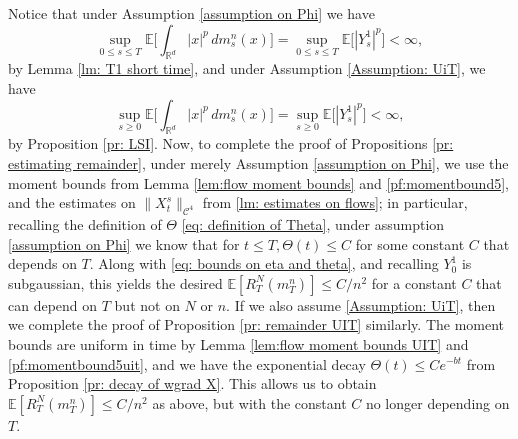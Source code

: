 \documentclass[11pt,reqno]{amsart}
\numberwithin{equation}{section}
\theoremstyle{definition}
\def\E{{\mathbb E}}
\def\R{{\mathbb R}}
\begin{document}
Notice that under Assumption \ref{assumption on Phi} we have
\begin{equation}
\sup_{0 \le s \le T}\E\Big[\int_{\R^d} |x|^p\,dm^n_s(x)\Big] = \sup_{0 \le s \le T}\E\big[|Y^1_s|^p\big] < \infty, \label{pf:momentbound5}
\end{equation}
by Lemma \ref{lm: T1 short time},
and under Assumption \ref{Assumption: UiT}, we have
\begin{equation}
\sup_{s \ge 0}\E\Big[\int_{\R^d} |x|^p\,dm^n_s(x)\Big] = \sup_{s \ge 0}\E\big[|Y^1_s|^p\big] < \infty, \label{pf:momentbound5uit}
\end{equation}
by Proposition \ref{pr: LSI}.
Now, to complete the proof of Propositions \ref{pr: estimating remainder}, under merely Assumption \ref{assumption on Phi}, we use the moment bounds from Lemma \ref{lem:flow moment bounds} and \eqref{pf:momentbound5}, and the estimates on $\|X_t^s\|_{\mathcal C^4}$ from \ref{lm: estimates on flows}; in particular, recalling the definition of $\Theta$ \eqref{eq: definition of Theta}, under assumption \ref{assumption on Phi} we know that for $t\leq T, \Theta(t)\leq C$ for some constant $C$ that depends on $T$. Along with  \eqref{eq: bounds on eta and theta}, and recalling $Y^1_0$ is subgaussian, this yields the desired $\E[R^N_T(m_T^n)] \le C/n^2$ for a constant $C$ that can depend on $T$ but not on $N$ or $n$.
If we also assume \ref{Assumption: UiT}, then we complete the proof of Proposition \ref{pr: remainder UIT} similarly. The moment bounds are uniform in time by Lemma \ref{lem:flow moment bounds UIT} and \eqref{pf:momentbound5uit}, and we have the exponential decay  $\Theta(t) \le Ce^{-bt}$ from Proposition \ref{pr: decay of wgrad X}. This allows us to obtain $\E[R^N_T(m_T^n)] \le C/n^2$ as above, but with the constant $C$ no longer depending on $T$. \hfill\qedsymbol
\end{document}
